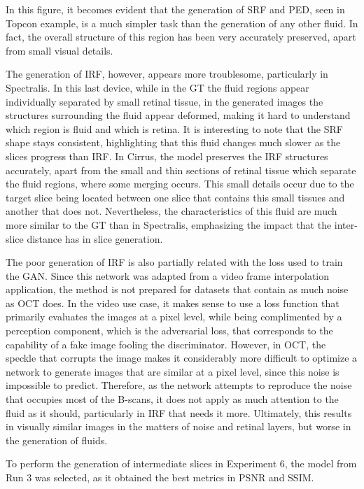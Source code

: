 In this figure, it becomes evident that the generation of SRF and PED, seen in Topcon example, is a much simpler task than the generation of any other fluid. In fact, the overall structure of this region has been very accurately preserved, apart from small visual details.
\par
The generation of IRF, however, appears more troublesome, particularly in Spectralis. In this last device, while in the GT the fluid regions appear individually separated by small retinal tissue, in the generated images the structures surrounding the fluid appear deformed, making it hard to understand which region is fluid and which is retina. It is interesting to note that the SRF shape stays consistent, highlighting that this fluid changes much slower as the slices progress than IRF. In Cirrus, the model preserves the IRF structures accurately, apart from the small and thin sections of retinal tissue which separate the fluid regions, where some merging occurs. This small details occur due to the target slice being located between one slice that contains this small tissues and another that does not. Nevertheless, the characteristics of this fluid are much more similar to the GT than in Spectralis, emphasizing the impact that the inter-slice distance has in slice generation.
\par
The poor generation of IRF is also partially related with the loss used to train the GAN. Since this network was adapted from a video frame interpolation application, the method is not prepared for datasets that contain as much noise as OCT does. In the video use case, it makes sense to use a loss function that primarily evaluates the images at a pixel level, while being complimented by a perception component, which is the adversarial loss, that corresponds to the capability of a fake image fooling the discriminator. However, in OCT, the speckle that corrupts the image makes it considerably more difficult to optimize a network to generate images that are similar at a pixel level, since this noise is impossible to predict. Therefore, as the network attempts to reproduce the noise that occupies most of the B-scans, it does not apply as much attention to the fluid as it should, particularly in IRF that needs it more. Ultimately, this results in visually similar images in the matters of noise and retinal layers, but worse in the generation of fluids.
\par
To perform the generation of intermediate slices in Experiment 6, the model from Run 3 was selected, as it obtained the best metrics in PSNR and SSIM.

